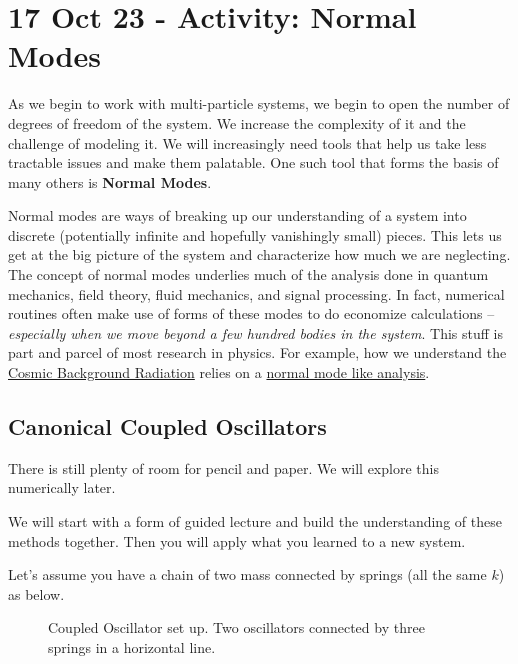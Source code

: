 \section{17 Oct 23 - Activity: Normal
Modes}\label{oct-23---activity-normal-modes}

As we begin to work with multi-particle systems, we begin to open the
number of degrees of freedom of the system. We increase the complexity
of it and the challenge of modeling it. We will increasingly need tools
that help us take less tractable issues and make them palatable. One
such tool that forms the basis of many others is \textbf{Normal Modes}.

Normal modes are ways of breaking up our understanding of a system into
discrete (potentially infinite and hopefully vanishingly small) pieces.
This lets us get at the big picture of the system and characterize how
much we are neglecting. The concept of normal modes underlies much of
the analysis done in quantum mechanics, field theory, fluid mechanics,
and signal processing. In fact, numerical routines often make use of
forms of these modes to do economize calculations -- \emph{especially
when we move beyond a few hundred bodies in the system}. This stuff is
part and parcel of most research in physics. For example, how we
understand the
\href{https://en.wikipedia.org/wiki/Cosmic_background_radiation}{Cosmic
Background Radiation} relies on a
\href{https://www.quantamagazine.org/how-ancient-light-reveals-the-universes-contents-20200128/}{normal
mode like analysis}.

\subsection{Canonical Coupled
Oscillators}\label{canonical-coupled-oscillators}

There is still plenty of room for pencil and paper. We will explore this
numerically later.

We will start with a form of guided lecture and build the understanding
of these methods together. Then you will apply what you learned to a new
system.

Let's assume you have a chain of two mass connected by springs (all the
same \(k\)) as below.

\begin{figure}
\centering
{}
\caption{Coupled Oscillator set up. Two oscillators connected by three
springs in a horizontal line.}
\end{figure}

